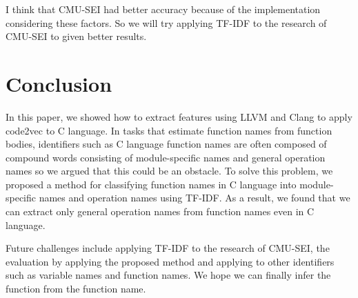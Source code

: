 \documentclass[JIP]{apris}
\begin{document}
I think that CMU-SEI had better accuracy because of the implementation considering these factors.
So we will try applying TF-IDF to the research of CMU-SEI to given better results.


\section{Conclusion}
In this paper, we showed how to extract features using LLVM and Clang to apply code2vec to C language.
In tasks that estimate function names from function bodies, identifiers such as C language function names are often composed of compound words consisting of module-specific names and general operation names so we argued that this could be an obstacle.
To solve this problem, we proposed a method for classifying function names in C language into module-specific names and operation names using TF-IDF.
As a result, we found that we can extract only general operation names from function names even in C language.

Future challenges include applying TF-IDF to the research of CMU-SEI, the evaluation by applying the proposed method and applying to other identifiers such as variable names and function names. We hope we can finally infer the function from the function name.
\end{document}
